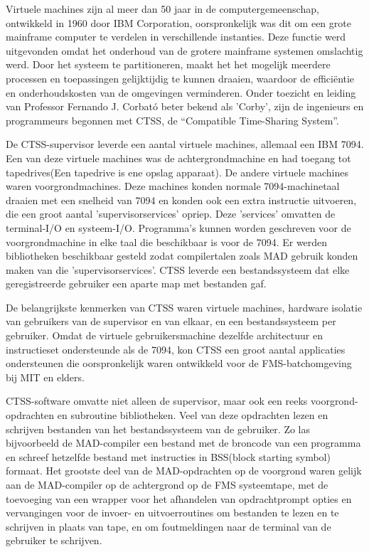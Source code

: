 Virtuele machines zijn al meer dan 50 jaar in de computergemeenschap, ontwikkeld in 1960 door IBM Corporation, oorspronkelijk was dit om een grote mainframe computer te verdelen in verschillende instanties. Deze functie werd uitgevonden omdat het onderhoud van de grotere mainframe systemen omslachtig werd. Door het systeem te partitioneren, maakt het het mogelijk meerdere processen en toepassingen gelijktijdig te kunnen draaien, waardoor de efficiëntie en onderhoudskosten van de omgevingen verminderen. Onder toezicht en leiding van Professor Fernando J. Corbató beter bekend als 'Corby', zijn de ingenieurs en programmeurs begonnen met CTSS, de “Compatible Time-Sharing System”. \autocite{Radhwan2013}

De CTSS-supervisor leverde een aantal virtuele machines, allemaal een IBM 7094. Een van deze virtuele machines was de achtergrondmachine en had toegang tot tapedrives(Een tapedrive is ene opslag apparaat). De andere virtuele machines waren voorgrondmachines. Deze machines konden normale 7094-machinetaal draaien met een snelheid van 7094 en konden ook een extra instructie uitvoeren, die een groot aantal 'supervisorservices' opriep. Deze 'services' omvatten de terminal-I/O en systeem-I/O. Programma's kunnen worden geschreven voor de voorgrondmachine in elke taal die beschikbaar is voor de 7094. Er werden bibliotheken beschikbaar gesteld zodat compilertalen zoals MAD gebruik konden maken van die 'supervisorservices'. CTSS leverde een bestandssysteem dat elke geregistreerde gebruiker een aparte map met bestanden gaf. \autocite{VanVleck2015}

De belangrijkste kenmerken van CTSS waren virtuele machines, hardware isolatie van gebruikers van de supervisor en van elkaar, en een bestandssysteem per gebruiker. Omdat de virtuele gebruikersmachine dezelfde architectuur en instructieset ondersteunde als de 7094, kon CTSS een groot aantal applicaties ondersteunen die oorspronkelijk waren ontwikkeld voor de FMS-batchomgeving bij MIT en elders. \autocite{VanVleck2015}

CTSS-software omvatte niet alleen de supervisor, maar ook een reeks voorgrond-opdrachten en subroutine bibliotheken. Veel van deze  opdrachten lezen en schrijven bestanden van het bestandssysteem van de gebruiker. Zo las bijvoorbeeld de MAD-compiler een bestand met de broncode van een programma en schreef hetzelfde bestand met instructies in BSS(block starting symbol) formaat. Het grootste deel van de MAD-opdrachten op de voorgrond waren gelijk aan de MAD-compiler op de achtergrond op de FMS systeemtape, met de toevoeging van een wrapper voor het afhandelen van opdrachtprompt opties en vervangingen voor de invoer- en uitvoerroutines om bestanden te lezen en te schrijven in plaats van tape, en om foutmeldingen naar de terminal van de gebruiker te schrijven. \autocite{VanVleck2015}

